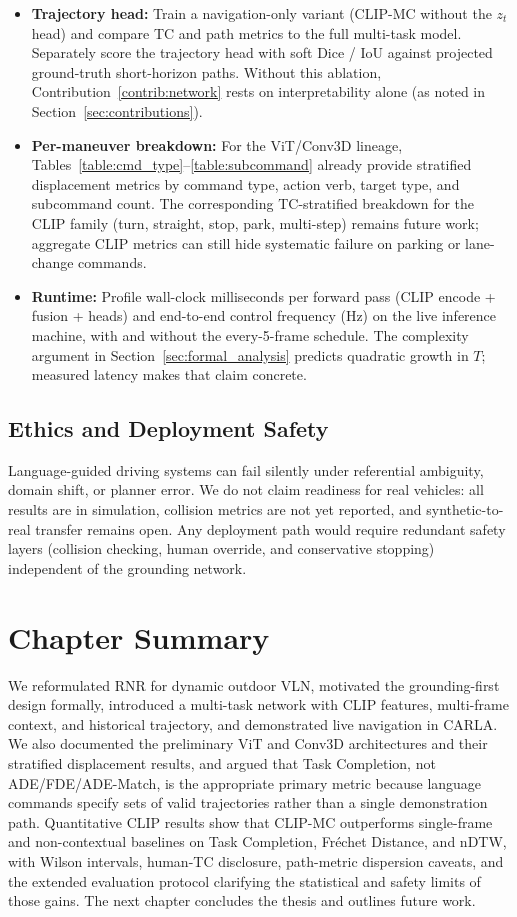 \begin{itemize}
    \item \textbf{Trajectory head:} Train a navigation-only variant (CLIP-MC without the $z_t$ head) and compare TC and path metrics to the full multi-task model. Separately score the trajectory head with soft Dice / IoU against projected ground-truth short-horizon paths. Without this ablation, Contribution~\ref{contrib:network} rests on interpretability alone (as noted in Section~\ref{sec:contributions}).
    \item \textbf{Per-maneuver breakdown:} For the ViT/Conv3D lineage, Tables~\ref{table:cmd_type}--\ref{table:subcommand} already provide stratified displacement metrics by command type, action verb, target type, and subcommand count. The corresponding TC-stratified breakdown for the CLIP family (turn, straight, stop, park, multi-step) remains future work; aggregate CLIP metrics can still hide systematic failure on parking or lane-change commands.
    \item \textbf{Runtime:} Profile wall-clock milliseconds per forward pass (CLIP encode + fusion + heads) and end-to-end control frequency (Hz) on the live inference machine, with and without the every-5-frame schedule. The complexity argument in Section~\ref{sec:formal_analysis} predicts quadratic growth in $T$; measured latency makes that claim concrete.
\end{itemize}

\subsection{Ethics and Deployment Safety}

Language-guided driving systems can fail silently under referential ambiguity, domain shift, or planner error. We do not claim readiness for real vehicles: all results are in simulation, collision metrics are not yet reported, and synthetic-to-real transfer remains open. Any deployment path would require redundant safety layers (collision checking, human override, and conservative stopping) independent of the grounding network.

\section{Chapter Summary}

We reformulated RNR for dynamic outdoor VLN, motivated the grounding-first design formally, introduced a multi-task network with CLIP features, multi-frame context, and historical trajectory, and demonstrated live navigation in CARLA. We also documented the preliminary ViT and Conv3D architectures and their stratified displacement results, and argued that Task Completion, not ADE/FDE/ADE-Match, is the appropriate primary metric because language commands specify sets of valid trajectories rather than a single demonstration path. Quantitative CLIP results show that CLIP-MC outperforms single-frame and non-contextual baselines on Task Completion, Fr\'{e}chet Distance, and nDTW, with Wilson intervals, human-TC disclosure, path-metric dispersion caveats, and the extended evaluation protocol clarifying the statistical and safety limits of those gains. The next chapter concludes the thesis and outlines future work.
